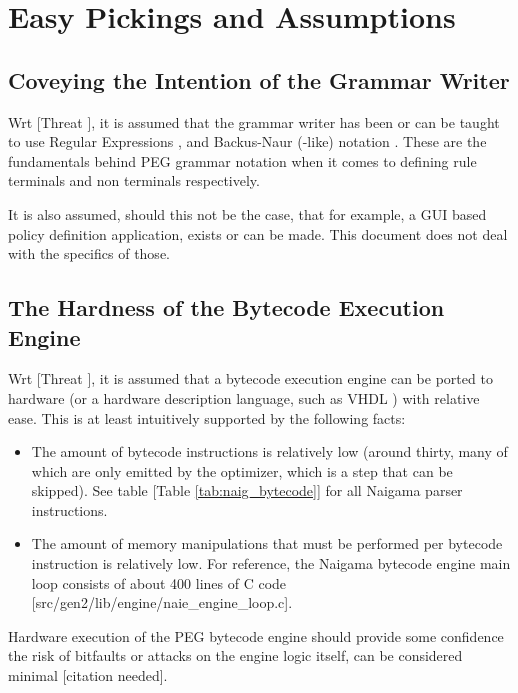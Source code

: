 \section{Easy Pickings and Assumptions}

\subsection{Coveying the Intention of the Grammar Writer}

Wrt [Threat \thethreatintent], it is assumed that the grammar writer has been
or can be taught to use Regular Expressions \cite{bib:regex}, and
Backus-Naur (-like) notation \cite{bib:backusnaur}. These are the fundamentals
behind PEG grammar notation when it comes to defining rule terminals and
non terminals respectively.

It is also assumed, should this not be the case, that for example, a GUI
based policy definition application, exists or can be made. This document
does not deal with the specifics of those.

\subsection{The Hardness of the Bytecode Execution Engine}

Wrt [Threat \thethreatengine], it is assumed that a bytecode execution
engine can be ported to hardware (or a hardware description language, such
as VHDL \cite{bib:vhdl})  with relative ease. This is at least
intuitively supported by the following facts:

\begin{itemize}
\item The amount of bytecode instructions is relatively low (around thirty,
      many of which are only emitted by the optimizer, which is a step
      that can be skipped). See table [Table \ref{tab:naig_bytecode}]
      for all Naigama parser instructions.
\item The amount of memory manipulations that must be performed per
      bytecode instruction is relatively low. For reference, the Naigama
      bytecode engine main loop consists of about 400 lines of C code
      [src/gen2/lib/engine/naie\_engine\_loop.c].
\end{itemize}

Hardware execution of the PEG bytecode engine should provide some
confidence the risk of bitfaults or attacks on the engine logic itself, can
be considered minimal [citation needed].
